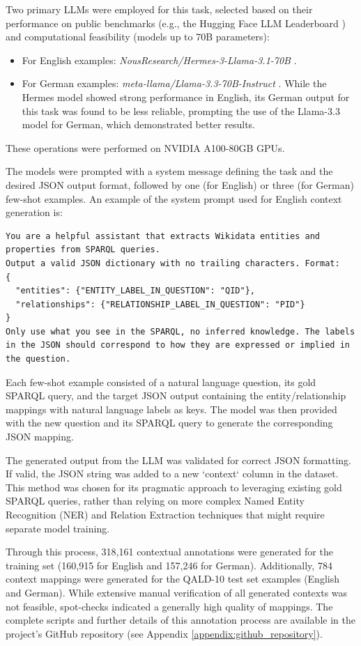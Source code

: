 \begin{enumerate}
    Two primary LLMs were employed for this task, selected based on their performance on public benchmarks (e.g., the Hugging Face LLM Leaderboard \cite{chiang2024chatbotarenaopenplatform}) and computational feasibility (models up to 70B parameters):
    \begin{itemize}
        \item For English examples: \textit{NousResearch/Hermes-3-Llama-3.1-70B} \cite{teknium2024hermes}.
        \item For German examples: \textit{meta-llama/Llama-3.3-70B-Instruct} \cite{grattafiori2024llama3herdmodels}. While the Hermes model showed strong performance in English, its German output for this task was found to be less reliable, prompting the use of the Llama-3.3 model for German, which demonstrated better results.
    \end{itemize}
    These operations were performed on NVIDIA A100-80GB GPUs.

    The models were prompted with a system message defining the task and the desired JSON output format, followed by one (for English) or three (for German) few-shot examples. An example of the system prompt used for English context generation is:
\begin{lstlisting}[breaklines=true, basicstyle=\ttfamily\scriptsize, frame=single, title=System Prompt (English Context Generation)]
You are a helpful assistant that extracts Wikidata entities and properties from SPARQL queries.
Output a valid JSON dictionary with no trailing characters. Format:
{
  "entities": {"ENTITY_LABEL_IN_QUESTION": "QID"},
  "relationships": {"RELATIONSHIP_LABEL_IN_QUESTION": "PID"}
}
Only use what you see in the SPARQL, no inferred knowledge. The labels in the JSON should correspond to how they are expressed or implied in the question.
\end{lstlisting}
    Each few-shot example consisted of a natural language question, its gold SPARQL query, and the target JSON output containing the entity/relationship mappings with natural language labels as keys. The model was then provided with the new question and its SPARQL query to generate the corresponding JSON mapping.
    
    The generated output from the LLM was validated for correct JSON formatting. If valid, the JSON string was added to a new `context` column in the dataset. This method was chosen for its pragmatic approach to leveraging existing gold SPARQL queries, rather than relying on more complex Named Entity Recognition (NER) and Relation Extraction techniques that might require separate model training.
    
    Through this process, 318,161 contextual annotations were generated for the training set (160,915 for English and 157,246 for German). Additionally, 784 context mappings were generated for the QALD-10 test set examples (English and German). While extensive manual verification of all generated contexts was not feasible, spot-checks indicated a generally high quality of mappings. The complete scripts and further details of this annotation process are available in the project's GitHub repository (see Appendix \ref{appendix:github_repository}).
\end{enumerate}

